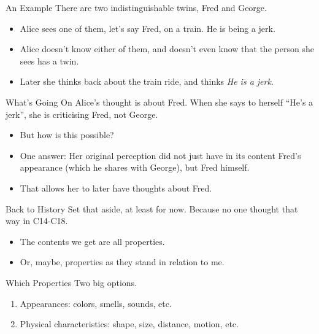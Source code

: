 \documentclass[
  17pt,
  letterpaper,
  ignorenonframetext,
  aspectratio=169,
]{beamer}
\providecommand{\tightlist}{%
  \setlength{\itemsep}{0pt}\setlength{\parskip}{0pt}}\usepackage{longtable,booktabs,array}
\begin{document}
\begin{frame}{An Example}
\protect\hypertarget{an-example}{}
There are two indistinguishable twins, Fred and George.

\begin{itemize}[<+->]
\tightlist
\item
  Alice sees one of them, let's say Fred, on a train. He is being a
  jerk.
\item
  Alice doesn't know either of them, and doesn't even know that the
  person she sees has a twin.
\item
  Later she thinks back about the train ride, and thinks \emph{He is a
  jerk}.
\end{itemize}
\end{frame}

\begin{frame}{What's Going On}
\protect\hypertarget{whats-going-on}{}
Alice's thought is about Fred. When she says to herself ``He's a jerk'',
she is criticising Fred, not George.

\begin{itemize}[<+->]
\tightlist
\item
  But how is this possible?
\item
  One answer: Her original perception did not just have in its content
  Fred's appearance (which he shares with George), but Fred himself.
\item
  That allows her to later have thoughts about Fred.
\end{itemize}
\end{frame}

\begin{frame}{Back to History}
\protect\hypertarget{back-to-history}{}
Set that aside, at least for now. Because no one thought that way in
C14-C18.

\begin{itemize}[<+->]
\tightlist
\item
  The contents we get are all properties.
\item
  Or, maybe, properties as they stand in relation to me.
\end{itemize}
\end{frame}

\begin{frame}{Which Properties}
\protect\hypertarget{which-properties}{}
Two big options.

\begin{enumerate}[<+->]
\tightlist
\item
  Appearances: colors, smells, sounds, etc.
\item
  Physical characteristics: shape, size, distance, motion, etc.
\end{enumerate}
\end{frame}
\end{document}
